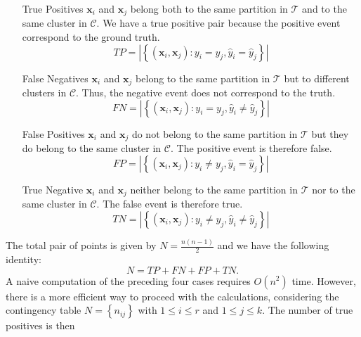 \documentclass[a4paper]{article}
\begin{document}
	\begin{itemize}
		\item[True Positives] $\boldsymbol{x}_{i}$ and $\boldsymbol{x}_{j}$ belong both to the same partition in $\mathcal{T}$ and to the same cluster in $\mathcal{C}$. We have a true positive pair because the positive event correspond to the ground truth.
		\begin{equation*}
		TP = \left|\left\{\left(\boldsymbol{x}_{i}, \boldsymbol{x}_{j}\right) : y_{i} = y_{j}, \hat{y}_{i} = \hat{y}_{j} \right\}\right|
		\end{equation*}
		\item[False Negatives] $\boldsymbol{x}_{i}$ and $\boldsymbol{x}_{j}$ belong to the same partition in $\mathcal{T}$ but to different clusters in $\mathcal{C}$. Thus, the negative event does not correspond to the truth.
		\begin{equation*}
		FN = \left|\left\{\left(\boldsymbol{x}_{i}, \boldsymbol{x}_{j}\right) : y_{i} = y_{j}, \hat{y}_{i} \neq \hat{y}_{j} \right\}\right|
		\end{equation*}
		\item[False Positives] $\boldsymbol{x}_{i}$ and $\boldsymbol{x}_{j}$ do not belong to the same partition in $\mathcal{T}$ but they do belong to the same cluster in $\mathcal{C}$. The positive event is therefore false.
		\begin{equation*}
		FP = \left|\left\{\left(\boldsymbol{x}_{i}, \boldsymbol{x}_{j}\right) : y_{i} \neq y_{j}, \hat{y}_{i} = \hat{y}_{j} \right\}\right|
		\end{equation*}
		\item[True Negative] $\boldsymbol{x}_{i}$ and $\boldsymbol{x}_{j}$ neither belong to the same partition in $\mathcal{T}$ nor to the same cluster in $\mathcal{C}$. The false event is therefore true.
		\begin{equation*}
		TN = \left|\left\{\left(\boldsymbol{x}_{i}, \boldsymbol{x}_{j}\right) : y_{i} \neq y_{j}, \hat{y}_{i} \neq \hat{y}_{j} \right\}\right|
		\end{equation*}
		\end{itemize}
		The total pair of points is given by $N = \frac{n\left(n-1\right)}{2}$ and we have the following identity:
		\begin{equation*}
		N = TP + FN + FP + TN.
		\end{equation*}
		A naive computation of the preceding four cases requires $O\left(n^{2}\right)$ time. However, there is a more efficient way to proceed with the calculations, considering the contingency table $N = \left\{ n_{ij} \right\}$ with $1 \leq i \leq r$ and $1 \leq j \leq k$. The number of true positives is then
\end{document}
